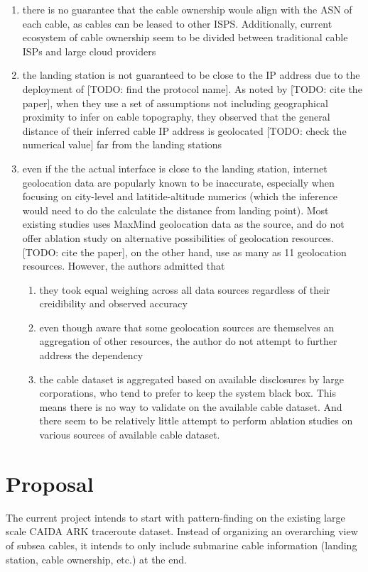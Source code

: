 \documentclass[twocolumn]{article}
\begin{document}
\begin{enumerate}
    \item there is no guarantee that the cable ownership woule align with the ASN of each cable, as cables can be leased to other ISPS. Additionally, current ecosystem of cable ownership seem to be divided between traditional cable ISPs and large cloud providers

    \item the landing station is not guaranteed to be close to the IP address due to the deployment of [TODO: find the protocol name]. As noted by [TODO: cite the paper], when they use a set of assumptions not including geographical proximity to infer on cable topography, they observed that the general distance of their inferred cable IP address is geolocated [TODO: check the numerical value] far from the landing stations

    \item even if the the actual interface is close to the landing station, internet geolocation data are popularly known to be inaccurate, especially when focusing on city-level and latitide-altitude numerics (which the inference would need to do the calculate the distance from landing point). Most existing studies uses MaxMind geolocation data as the source, and do not offer ablation study on alternative possibilities of geolocation resources. [TODO: cite the paper], on the other hand, use as many as 11 geolocation resources. 
        However, the authors admitted that 
        \begin{enumerate}
            \item they took equal weighing across all data sources regardless of their creidibility and observed accuracy
            \item even though aware that some geolocation sources are themselves an aggregation of other resources, the author do not attempt to further address the dependency
            \item the cable dataset is aggregated based on available disclosures by large corporations, who tend to prefer to keep the system black box. This means there is no way to validate on the available cable dataset. And there seem to be relatively little attempt to perform ablation studies on various sources of available cable dataset.
        \end{enumerate}
 \end{enumerate}

\section{Proposal}
The current project intends to start with pattern-finding on the existing large scale CAIDA ARK traceroute dataset. Instead of organizing an overarching view of subsea cables, it intends to only include submarine cable information (landing station, cable ownership, etc.) at the end.
\end{document}
